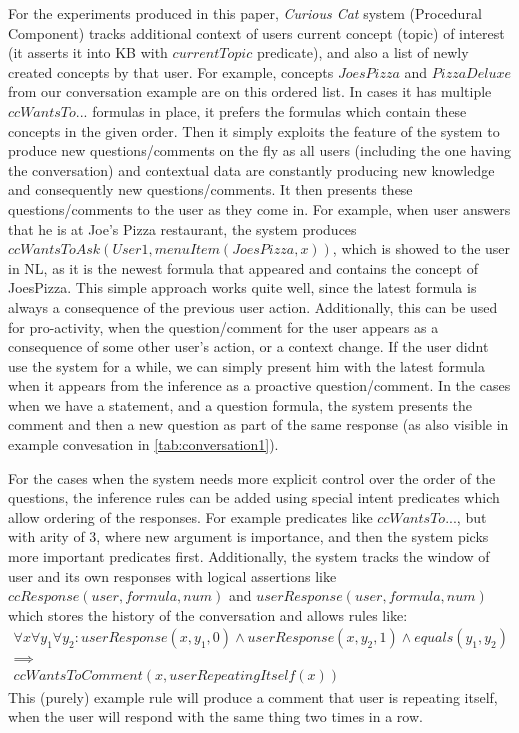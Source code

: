 For the experiments produced in this paper, \emph{Curious Cat} system 
(Procedural Component) tracks additional context of users current concept 
(topic) of interest (it asserts it into KB with $currentTopic$ predicate), and 
also a list of newly created concepts by that user. For example, concepts 
$JoesPizza$ and $PizzaDeluxe$ from our conversation example are on this ordered
list. In cases it has multiple $ccWantsTo...$ formulas in place, it prefers 
the formulas which contain these concepts in the given order. Then it simply 
exploits the feature of the system to produce new questions/comments on the fly
as all users (including the one having the conversation) and contextual data 
are constantly producing new knowledge and consequently new questions/comments.
It then presents these questions/comments to the user as they come in. For 
example, when user answers that he is at Joe's Pizza restaurant, the system 
produces $ccWantsToAsk(User1, menuItem(JoesPizza,x))$, which is showed to the 
user in NL, as it is the newest formula that appeared and contains the concept 
of JoesPizza. This simple approach works quite well, since the latest formula 
is always a consequence of the previous user action. Additionally, this can be 
used for pro-activity, when the question/comment for the user appears as a 
consequence of some other user's action, or a context change. If the user didnt
use the system for a while, we can simply present him with the latest formula 
when it appears from the inference as a proactive question/comment. In the cases
when we have a statement, and a question formula, the system presents the 
comment and then a new question as part of the same response (as also visible
in example convesation in \autoref{tab:conversation1}).

For the cases when the system needs more explicit control over the order of 
the questions, the inference rules can be added using special intent predicates
which allow ordering of the responses. For example predicates like 
$ccWantsTo...$, but with arity of 3, where new argument is importance, and then
the system picks more important predicates first. Additionally, the system 
tracks the window of user and its own responses with logical assertions like 
$ccResponse(user,formula,num)$ and $userResponse(user,formula,num)$ which 
stores the history of the conversation and allows rules like:
\begin{equation*}
\begin{gathered}
	\forall x \forall y_1 \forall y_2: userResponse(x,y_1,0) \land userResponse(x,y_2,1) \land equals(y_1,y_2) \\
	\implies \\
	ccWantsToComment(x,userRepeatingItself(x))
\end{gathered}
\end{equation*}
This (purely) example rule will produce a comment that user is repeating itself,
when the user will respond with the same thing two times in a row.

